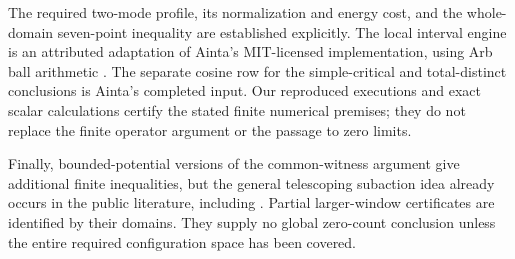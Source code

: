 The required two-mode profile, its normalization and energy cost,
and the whole-domain seven-point inequality are established explicitly.
The local interval engine is an attributed adaptation of Ainta's
MIT-licensed implementation, using Arb ball arithmetic \cite{Johansson}.
The separate cosine row for the simple-critical and total-distinct
conclusions is Ainta's completed input. Our reproduced executions
and exact scalar calculations certify the stated finite numerical
premises; they do not replace the finite operator argument or the
passage to zero limits. 

Finally, bounded-potential versions of the common-witness argument
give additional finite inequalities, but the general telescoping
subaction idea already occurs in the public literature, including
\cite{Devine}. Partial larger-window certificates are identified by
their domains. They supply no global zero-count conclusion unless
the entire required configuration space has been covered.
